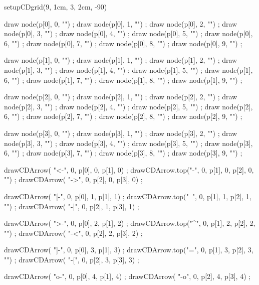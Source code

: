 
\usemodule[commDiag]

\startMPpage

setupCDgrid(9, 1cm, 3, 2cm, -90)

draw node(p[0], 0, "") ;
draw node(p[0], 1, "") ;
draw node(p[0], 2, "") ;
draw node(p[0], 3, "") ;
draw node(p[0], 4, "") ;
draw node(p[0], 5, "") ;
draw node(p[0], 6, "") ;
draw node(p[0], 7, "") ;
draw node(p[0], 8, "") ;
draw node(p[0], 9, "") ;

draw node(p[1], 0, "") ;
draw node(p[1], 1, "") ;
draw node(p[1], 2, "") ;
draw node(p[1], 3, "") ;
draw node(p[1], 4, "") ;
draw node(p[1], 5, "") ;
draw node(p[1], 6, "") ;
draw node(p[1], 7, "") ;
draw node(p[1], 8, "") ;
draw node(p[1], 9, "") ;

draw node(p[2], 0, "") ;
draw node(p[2], 1, "") ;
draw node(p[2], 2, "") ;
draw node(p[2], 3, "") ;
draw node(p[2], 4, "") ;
draw node(p[2], 5, "") ;
draw node(p[2], 6, "") ;
draw node(p[2], 7, "") ;
draw node(p[2], 8, "") ;
draw node(p[2], 9, "") ;

draw node(p[3], 0, "") ;
draw node(p[3], 1, "") ;
draw node(p[3], 2, "") ;
draw node(p[3], 3, "") ;
draw node(p[3], 4, "") ;
draw node(p[3], 5, "") ;
draw node(p[3], 6, "") ;
draw node(p[3], 7, "") ;
draw node(p[3], 8, "") ;
draw node(p[3], 9, "") ;

drawCDArrow(   "<-", 0, p[0], 0, p[1], 0) ;
drawCDArrow.top("-", 0, p[1], 0, p[2], 0, "") ;
drawCDArrow(   "->", 0, p[2], 0, p[3], 0) ;

drawCDArrow(   "[-", 0, p[0], 1, p[1], 1) ;
drawCDArrow.top("~", 0, p[1], 1, p[2], 1, "") ;
drawCDArrow(   "-]", 0, p[2], 1, p[3], 1) ;

drawCDArrow(   ">-", 0, p[0], 2, p[1], 2) ;
drawCDArrow.top("^", 0, p[1], 2, p[2], 2, "") ;
drawCDArrow(   "-<", 0, p[2], 2, p[3], 2) ;

drawCDArrow(   "]-", 0, p[0], 3, p[1], 3) ;
drawCDArrow.top("=", 0, p[1], 3, p[2], 3, "") ;
drawCDArrow(   "-[", 0, p[2], 3, p[3], 3) ;

drawCDArrow(   "o-", 0, p[0], 4, p[1], 4) ;
drawCDArrow(   "-o", 0, p[2], 4, p[3], 4) ;

